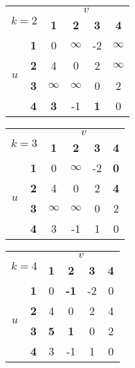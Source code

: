 \begin{center}
    \begin{tabular}{|c|c||c|c|c|c|}
        \hline
        \multicolumn{2}{|c|}{\multirow{2}{*}{$k=2$}} & \multicolumn{4}{c|}{$v$}\\
        \cline{3-6}
        \multicolumn{2}{|c|}{} & \textbf{1} & \textbf{2} & \textbf{3} & \textbf{4}\\
        \hline
        \hline
        \multirow{4}{*}{$u$} & \textbf{1} & 0 & $\infty$ & -2 & $\infty$\\
        \cline{2-6}
        & \textbf{2} & 4 & 0 & 2 & $\infty$\\
        \cline{2-6}
        & \textbf{3} & $\infty$ & $\infty$ & 0 & 2\\
        \cline{2-6}
        & \textbf{4} & \textbf{3} & -1 & \textbf{1} & 0\\
        \cline{2-6}
        \hline
    \end{tabular}
\end{center}

\begin{center}
    \begin{tabular}{|c|c||c|c|c|c|}
        \hline
        \multicolumn{2}{|c|}{\multirow{2}{*}{$k=3$}} & \multicolumn{4}{c|}{$v$}\\
        \cline{3-6}
        \multicolumn{2}{|c|}{} & \textbf{1} & \textbf{2} & \textbf{3} & \textbf{4}\\
        \hline
        \hline
        \multirow{4}{*}{$u$} & \textbf{1} & 0 & $\infty$ & -2 & \textbf{0}\\
        \cline{2-6}
        & \textbf{2} & 4 & 0 & 2 & \textbf{4}\\
        \cline{2-6}
        & \textbf{3} & $\infty$ & $\infty$ & 0 & 2\\
        \cline{2-6}
        & \textbf{4} & 3 & -1 & 1 & 0\\
        \cline{2-6}
        \hline
    \end{tabular}
\end{center}

\begin{center}
    \begin{tabular}{|c|c||c|c|c|c|}
        \hline
        \multicolumn{2}{|c|}{\multirow{2}{*}{$k=4$}} & \multicolumn{4}{c|}{$v$}\\
        \cline{3-6}
        \multicolumn{2}{|c|}{} & \textbf{1} & \textbf{2} & \textbf{3} & \textbf{4}\\
        \hline
        \hline
        \multirow{4}{*}{$u$} & \textbf{1} & 0 & \textbf{-1} & -2 & 0\\
        \cline{2-6}
        & \textbf{2} & 4 & 0 & 2 & 4\\
        \cline{2-6}
        & \textbf{3} & \textbf{5} & \textbf{1} & 0 & 2\\
        \cline{2-6}
        & \textbf{4} & 3 & -1 & 1 & 0\\
        \cline{2-6}
        \hline
    \end{tabular}
\end{center}


